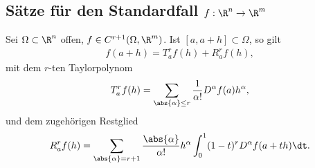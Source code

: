 \subsection{Sätze für den Standardfall $f: \R^n\to\R^m$}
\begin{prop}
Sei $\Omega\subset\R^n$ offen, $f\in C^{r+1}(\Omega,\R^m)$. Ist
$[a,a+h]\subset\Omega$, so gilt
\begin{align*}
f(a+h) = T_a^rf(h) + R_a^rf(h), 
\end{align*}
mit dem $r$-ten Taylorpolynom
\begin{align*}
T_a^rf(h) = \sum\limits_{\abs{\alpha}\le r} \frac{1}{\alpha!}D^\alpha
f(a)h^\alpha,
\end{align*}
und dem zugehörigen Restglied
\begin{align*}
R_a^rf(h) = \sum\limits_{\abs{\alpha}=r+1}\frac{\abs{\alpha}}{\alpha!} h^\alpha
\int_0^1 (1-t)^r D^\alpha f(a+th)\dt.
\end{align*}
\end{prop}

